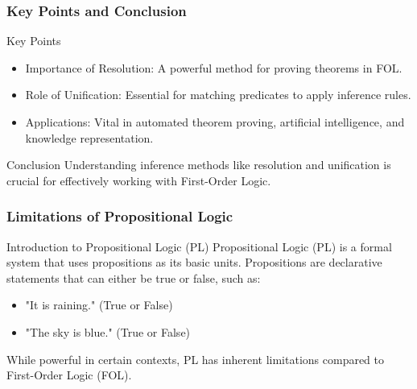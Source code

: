 \documentclass[aspectratio=169]{beamer}
\begin{document}
\begin{frame}[fragile]
    \frametitle{Key Points and Conclusion}
    \begin{block}{Key Points}
        \begin{itemize}
            \item Importance of Resolution: A powerful method for proving theorems in FOL.
            \item Role of Unification: Essential for matching predicates to apply inference rules.
            \item Applications: Vital in automated theorem proving, artificial intelligence, and knowledge representation.
        \end{itemize}
    \end{block}
    \begin{block}{Conclusion}
        Understanding inference methods like resolution and unification is crucial for effectively working with First-Order Logic. 
    \end{block}
\end{frame}

\begin{frame}[fragile]
    \frametitle{Limitations of Propositional Logic}
    
    \begin{block}{Introduction to Propositional Logic (PL)}
        Propositional Logic (PL) is a formal system that uses propositions as its basic units. Propositions are declarative statements that can either be true or false, such as:
        
        \begin{itemize}
            \item "It is raining." (True or False)
            \item "The sky is blue." (True or False)
        \end{itemize}
        
        While powerful in certain contexts, PL has inherent limitations compared to First-Order Logic (FOL).
    \end{block}
\end{frame}
\end{document}
